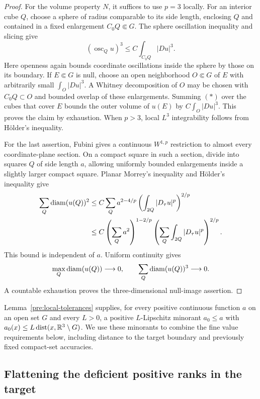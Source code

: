 \begin{proof}
For the volume property $N$, it suffices to use $p=3$ locally.
For an interior cube $Q$, choose a sphere of radius comparable to
its side length, enclosing $Q$ and contained in a fixed enlargement
$C_0Q\Subset G$.  The sphere oscillation inequality and slicing give
\[
 (\operatorname{osc}_Q u)^3
 \le C\int_{C_0Q}|Du|^3.                 \tag{$*$}
\]
Here openness again bounds coordinate oscillations inside the sphere
by those on its boundary.  If $E\Subset G$ is null, choose an open
neighborhood $O\Subset G$ of $E$ with arbitrarily small
$\int_O|Du|^3$.  A Whitney decomposition of $O$ may be chosen with
$C_0Q\subset O$ and bounded overlap of these enlargements.  Summing
$(*)$ over the cubes that cover $E$ bounds the outer volume of $u(E)$
by $C\int_O|Du|^3$.  This proves the claim by exhaustion.  When
$p>3$, local $L^3$ integrability follows from H\"older's inequality.

For the last assertion, Fubini gives a continuous $W^{1,p}$
restriction to almost every coordinate-plane section.  On a compact
square in such a section, divide into squares $Q$ of side length
$a$, allowing uniformly bounded enlargements inside a slightly larger
compact square.  Planar Morrey's inequality and H\"older's inequality
give
\[
 \begin{split}
 \sum_Q\operatorname{diam}(u(Q))^2
 &\le C\sum_Q
 a^{2-4/p}\left(\int_{2Q}|D_\tau u|^p\right)^{2/p}\\
 &\le C\left(\sum_Q a^2\right)^{1-2/p}
       \left(\sum_Q\int_{2Q}|D_\tau u|^p\right)^{2/p}.
 \end{split}
\]
This bound is independent of $a$.  Uniform continuity gives
\[
 \max_Q\operatorname{diam}(u(Q))\longrightarrow0,
 \qquad \sum_Q\operatorname{diam}(u(Q))^3\longrightarrow0.
\]
A countable exhaustion proves the three-dimensional null-image
assertion.
\end{proof}

\begin{remark}\label{hp:fine-tolerance}
Lemma~\ref{pre:local-tolerances} supplies, for every positive continuous
function $a$ on an open set $G$ and every $L>0$, a positive
$L$-Lipschitz minorant $a_0\le a$ with
$a_0(x)\le L\operatorname{dist}(x,\mathbb R^3\setminus G)$.  We use these minorants to
combine the fine value requirements below, including distance to the
target boundary and previously fixed compact-set accuracies.
\end{remark}


\subsection{Flattening the deficient positive ranks in the target}

